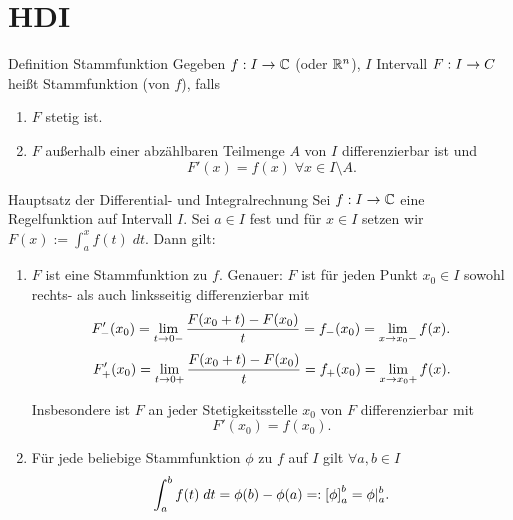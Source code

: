\documentclass[main.tex]{subfiles}
\begin{document}
\section*{HDI}

\begin{karte}{Definition Stammfunktion}
    Gegeben \( \abb{f}{I}{\C} \) (oder \( \R^n \)), 
    \(I\) Intervall    
    \( \abb{F}{I}{C} \) heißt Stammfunktion (von \(f\)), falls
    \begin{enumerate}
        \item \(F\) stetig ist.
        \item \(F\) außerhalb einer abzählbaren Teilmenge 
        \( A \) von \( I \) differenzierbar ist und 
        \[ F'(x) = f(x) \; \forall x\in I \setminus A. \]
    \end{enumerate}
\end{karte}

\begin{karte}{Hauptsatz der Differential- und Integralrechnung}
    Sei \( \abb{f}{I}{\C} \) eine Regelfunktion 
    auf Intervall \(I\). Sei \(a \in I\) fest und 
    für \( x\in I \) setzen wir 
    \( F(x) := \int_a^x f(t) \; dt. \)
    Dann gilt: 
    \begin{enumerate}
        \item \(F\) ist eine Stammfunktion zu \(f\).
        Genauer: \( F \) ist für jeden Punkt 
        \( x_0 \in I \) sowohl rechts- als auch linksseitig 
        differenzierbar mit 
        \[ F'_-(x_0) = \limesx{t}{0-} 
        \frac{F(x_0 + t) - F(x_0)}{t} 
        = f_-(x_0) = \limesx{x}{x_0-} f(x). \]
        \[ F'_+(x_0) = \limesx{t}{0+} 
        \frac{F(x_0 + t) - F(x_0)}{t} 
        = f_+(x_0) = \limesx{x}{x_0+} f(x). \]
        
        Insbesondere ist \(F\) an jeder Stetigkeitsstelle 
        \( x_0 \) von \(F\) differenzierbar mit 
        \[ F'(x_0) = f(x_0). \]
        \item Für jede beliebige Stammfunktion \(\phi \) 
        zu \(f\) auf \(I\) gilt \( \forall a,b \in I \)
        \[ \integralx{f(t)}{a}{b}{t} = \phi(b)-\phi(a) 
        =: \left[ \phi \right]^b_a = \phi \vert_a^b. \]
    \end{enumerate}
\end{karte}
\end{document}
